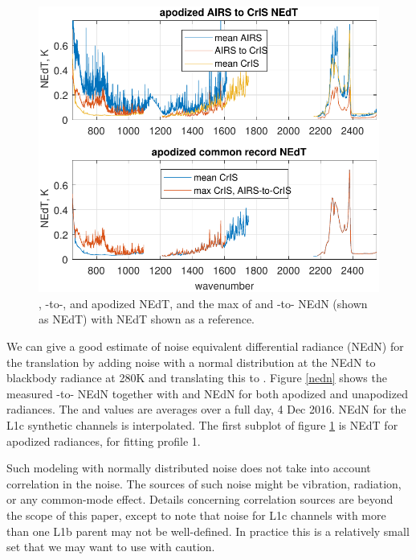 \documentclass[journal]{IEEEtran}
\begin{document}
\begin{figure} %
  \centering
  \includegraphics[width=\linewidth]{figures/a2cris_nedt.pdf}
  \caption{{\airs}, {\airs}-to-{\cris}, and {\cris} apodized NEdT,
    and the max of {\cris} and {\airs}-to-{\cris} NEdN (shown as
    NEdT) with {\cris} NEdT shown as a reference.}
  \label{nedt}
\end{figure}

We can give a good estimate of noise equivalent differential
radiance (NEdN) for the translation by adding noise with a normal
distribution at the {\airs} NEdN to blackbody radiance at 280K and
translating this to {\cris}.  Figure \ref{nedn} shows the measured
{\airs}-to-{\cris} NEdN together with {\airs} and {\cris} NEdN for
both apodized and unapodized radiances.  The {\airs} and {\cris}
values are averages over a full day, 4 Dec 2016.  NEdN for the L1c
synthetic channels is interpolated.  The first subplot of figure
\ref{nedt} is NEdT for apodized radiances, for fitting profile 1.

Such modeling with normally distributed noise does not take into
account correlation in the {\airs} noise.  The sources of such noise
might be vibration, radiation, or any common-mode effect.  Details
concerning correlation sources are beyond the scope of this paper,
except to note that noise for L1c channels with more than one L1b
parent may not be well-defined.  In practice this is a relatively
small set that we may want to use with caution.

\end{document}
